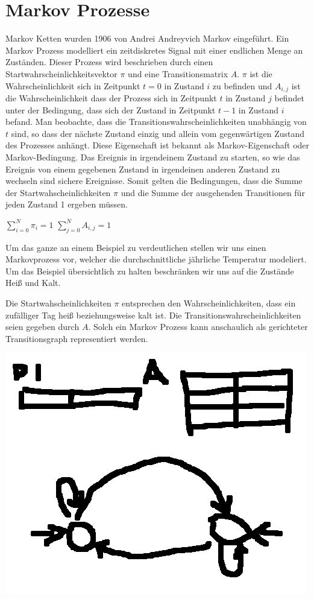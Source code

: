\section{Markov Prozesse}
Markov Ketten wurden 1906 von Andrei Andreyvich Markov eingeführt. %
Ein Markov Prozess modelliert ein zeitdiskretes Signal mit einer endlichen Menge an Zuständen.
Dieser Prozess wird beschrieben durch einen Startwahrscheinlichkeitsvektor $\pi$ und eine Transitionsmatrix $A$.
$\pi$ ist die Wahrscheinlichkeit sich in Zeitpunkt $t=0$ in Zustand $i$ zu befinden
und $A_{i,j}$ ist die Wahrscheinlichkeit dass der Prozess sich in Zeitpunkt $t$ in Zustand $j$ befindet 
unter der Bedingung, dass sich der Zustand in Zeitpunkt $t-1$ in Zustand $i$ befand.
Man beobachte, dass die Transitionswahrscheinlichkeiten unabhängig von $t$ sind, so dass der nächste Zustand 
einzig und allein vom gegenwärtigen Zustand des Prozesses anhängt.
Diese Eigenschaft ist bekannt als Markov-Eigenschaft oder Markov-Bedingung.
Das Ereignis in irgendeinem Zustand zu starten, so wie das Ereignis von einem gegebenen Zustand in irgendeinen anderen Zustand zu wechseln sind sichere Ereignisse.
Somit gelten die Bedingungen, dass die Summe der Startwahscheinlichkeiten $\pi$
und die Summe der ausgehenden Transitionen für jeden Zustand 1 ergeben müssen.

$\sum_{i = 0}^{N} \pi_i = 1 $
$\sum_{j = 0}^{N} A_{i,j} = 1 $

Um das ganze an einem Beispiel zu verdeutlichen stellen wir uns einen Markovprozess vor, welcher 
die durchschnittliche jährliche Temperatur modeliert. Um das Beispiel übersichtlich zu halten beschränken wir uns auf die Zustände Heiß und Kalt.

Die Startwahscheinlichkeiten $\pi$ entsprechen den Wahrscheinlichkeiten, dass ein zufälliger Tag heiß beziehungsweise kalt ist.
Die Transitionswahrscheinlichkeiten seien gegeben durch $A$.
Solch ein Markov Prozess kann anschaulich als gerichteter Transitionsgraph representiert werden.

\includegraphics[scale=1.0]{images/Markov_Chain_Example.png}

